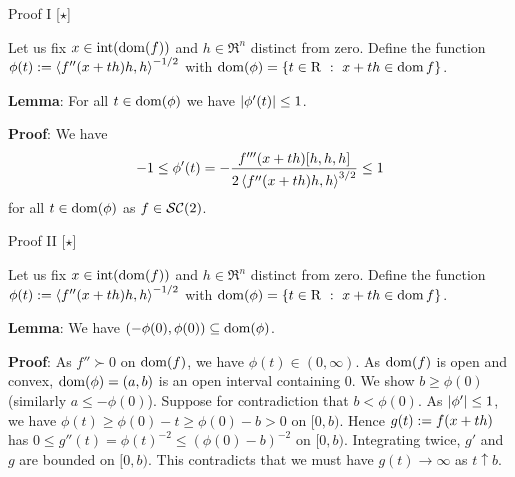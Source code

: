 \documentclass[9pt]{beamer}
\begin{document}
\begin{frame}{Proof I [$\star$]}

  Let us fix $x\in \operatorname{int}(\operatorname{dom}(f))$ and $h\in \Re^n$ distinct from zero.
  Define the function $\phi(t) := \left<f''(x+th)h, h\right>^{-1/2}$ with $\operatorname{dom}(\phi) = \left\{ t\in\mathrm{R}\ : \ x+th\in \operatorname{dom} f \right\}$.

  \vspace{1em}

  \textbf{Lemma}:
  For all $t\in \operatorname{dom} (\phi)$ we have $\left|\phi'(t)\right| \leq 1$.

  \vspace{1em}
  
  \textbf{Proof}:
  We have 
  \[
    -1 \leq \phi'(t) = -\frac{f'''(x+th)[h, h, h]}{2 \left<f''(x+th)h,  h\right>^{3/2}}\leq 1
  \]
  for all $t\in \operatorname{dom} (\phi)$ as $f\in \mathcal{SC}(2)$.
  

  
\end{frame}

\begin{frame}{Proof II [$\star$]}

  Let us fix $x\in \operatorname{int}(\operatorname{dom}(f))$ and $h\in \Re^n$ distinct from zero.
  Define the function $\phi(t) := \left<f''(x+th)h, h\right>^{-1/2}$ with $\operatorname{dom}(\phi) = \left\{ t\in\mathrm{R}\ : \ x+th\in \operatorname{dom} f \right\}$.

  \vspace{1em}

  \textbf{Lemma}:
  We have \((-\phi(0), \phi(0)) \subseteq \operatorname{dom}(\phi)\).

  \vspace{1em}
  
  \textbf{Proof}: As $f''\succ 0$ on $\operatorname{dom}(f)$, we have $\phi(t)\in(0,\infty)$. As $\operatorname{dom}(f)$ is open and convex, $\operatorname{dom}(\phi)=(a, b)$ is an open interval containing $0$. We show $b\geq \phi(0)$ (similarly $a\leq -\phi(0)$). Suppose for contradiction that $b<\phi(0)$. As $\left|\phi'\right|\leq 1$, we have $\phi(t)\geq \phi(0)-t\geq\phi(0)-b>0$ on $[0, b)$. Hence $g(t):= f(x+th)$ has $0\leq g''(t) = \phi(t)^{-2}\leq (\phi(0)-b)^{-2}$ on $[0, b)$. Integrating twice, $g'$ and $g$ are bounded on $[0, b)$. This contradicts that we must have $g(t)\to\infty$ as $t\uparrow b$.
\end{frame}
\end{document}
